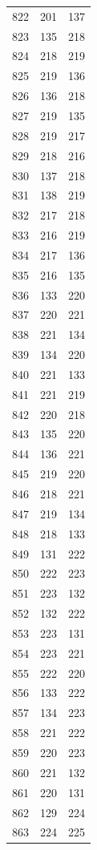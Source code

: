 \documentclass[a4paper,11pt]{article}
\begin{document}
\begin{center}
\begin{longtable}{|R{1.5cm}|R{1.5cm}|R{1.5cm}|}
  822 &  201 &  137 \\
  823 &  135 &  218 \\
  824 &  218 &  219 \\
  825 &  219 &  136 \\
  826 &  136 &  218 \\
  827 &  219 &  135 \\
  828 &  219 &  217 \\
  829 &  218 &  216 \\
  830 &  137 &  218 \\
  831 &  138 &  219 \\
  832 &  217 &  218 \\
  833 &  216 &  219 \\
  834 &  217 &  136 \\
  835 &  216 &  135 \\
  836 &  133 &  220 \\
  837 &  220 &  221 \\
  838 &  221 &  134 \\
  839 &  134 &  220 \\
  840 &  221 &  133 \\
  841 &  221 &  219 \\
  842 &  220 &  218 \\
  843 &  135 &  220 \\
  844 &  136 &  221 \\
  845 &  219 &  220 \\
  846 &  218 &  221 \\
  847 &  219 &  134 \\
  848 &  218 &  133 \\
  849 &  131 &  222 \\
  850 &  222 &  223 \\
  851 &  223 &  132 \\
  852 &  132 &  222 \\
  853 &  223 &  131 \\
  854 &  223 &  221 \\
  855 &  222 &  220 \\
  856 &  133 &  222 \\
  857 &  134 &  223 \\
  858 &  221 &  222 \\
  859 &  220 &  223 \\
  860 &  221 &  132 \\
  861 &  220 &  131 \\
  862 &  129 &  224 \\
  863 &  224 &  225 \\

\end{longtable}
\end{center}
\end{document}
